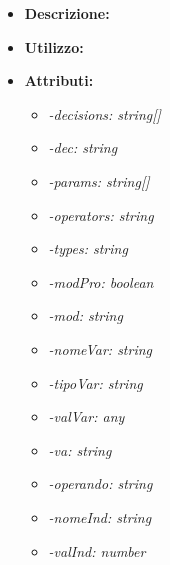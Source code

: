 \begin{itemize}
	
	\item \textbf{Descrizione:}\\
	
	\item \textbf{Utilizzo:}\\
	
	\item \textbf{Attributi:}
		\begin{itemize}
			\item \emph{-decisions: string[]}\\
			
			\item \emph{-dec: string}\\
			
			\item \emph{-params: string[]}\\
			
			\item \emph{-operators: string}\\
			
			\item \emph{-types: string}\\
			
			\item \emph{-modPro: boolean}\\
			
			\item \emph{-mod: string}\\
			
			\item \emph{-nomeVar: string}\\
			
			\item \emph{-tipoVar: string}\\
			
			\item \emph{-valVar: any}\\
			
			\item \emph{-va: string}\\
			
			\item \emph{-operando: string}\\
			
			\item \emph{-nomeInd: string}\\
			
			\item \emph{-valInd: number}\\
			

\end{itemize}
\end{itemize}
